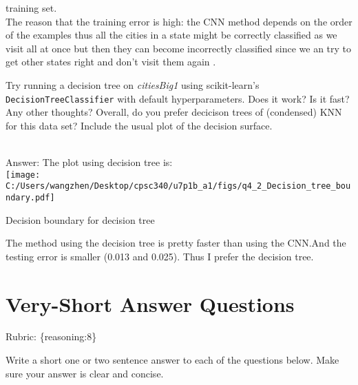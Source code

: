 \documentclass{article}
\def\blu#1{{\color{blu}#1}}
\def\gre#1{{\color{gre}#1}}
\def\rubric#1{\gre{Rubric: \{#1\}}}{}
\begin{document}
{{{training set. \\The reason that the training error is high: the CNN method depends on the
order of the examples thus all the cities in a state might be correctly classified as we visit all at once but
then they can become incorrectly classified since we an try to get
other states right and don't visit them again .}
\item Try running a decision tree on \emph{citiesBig1} using scikit-learn's \texttt{DecisionTreeClassifier} with default hyperparameters. Does it work? Is it fast? Any other thoughts? Overall, do you prefer decicison trees of (condensed) KNN for this data set? Include the usual plot of the decision surface.
\textcolor{gre}{\\Answer: The plot using decision tree is:\\
\texttt{[image: C:/Users/wangzhen/Desktop/cpsc340/u7p1b\_a1/figs/q4\_2\_Decision\_tree\_boundary.pdf]}
\caption{Decision boundary for decision tree}
The method using the decision tree is pretty faster than using the CNN.And the testing error is smaller (0.013 and 0.025). Thus I prefer the decision tree.}
}
}



\section{Very-Short Answer Questions}
\rubric{reasoning:8}

\blu{Write a short one or two sentence answer to each of the questions below}. Make sure your answer is clear and concise.
\end{document}
